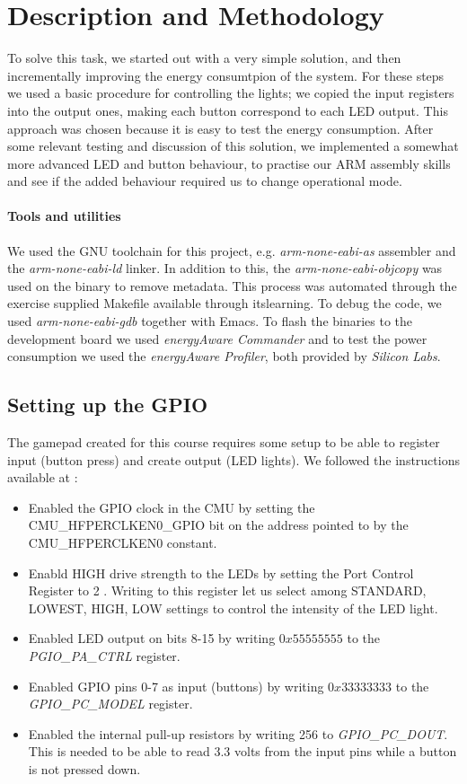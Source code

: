 \section{Description and Methodology}
\label{section:description_and_methodology}
To solve this task, we started out with a very simple solution, and then incrementally improving the energy consumtpion of the system. For these steps we used a basic procedure for controlling the lights; we copied the input registers into the output ones, making each button correspond to each LED output. This approach was chosen because it is easy to test the energy consumption. After some relevant testing and discussion of this solution, we implemented a somewhat more advanced LED and button behaviour, to practise our ARM assembly skills and see if the added behaviour required us to change operational mode. 

	\paragraph{Tools and utilities}
	We used the GNU toolchain for this project, e.g. \emph{arm-none-eabi-as} assembler and the \emph{arm-none-eabi-ld} linker. In addition to this, the \emph{arm-none-eabi-objcopy} was used on the binary to remove metadata. This process was automated through the exercise supplied Makefile available through itslearning. To debug the code, we used \emph{arm-none-eabi-gdb} together with Emacs. To flash the binaries to the development board we used \emph{energyAware Commander} and to test the power consumption we used the \emph{energyAware Profiler}, both provided by \emph{Silicon Labs}.
	\subsection{Setting up the GPIO}
	\label{subsection:gpio_setup}
	The gamepad created for this course requires some setup to be able to register input (button press) and create output (LED lights). We followed the instructions available at \cite[p. 24]{compendium}:
	
	\begin{itemize}
		\item Enabled the GPIO clock in the CMU by setting the CMU\_HFPERCLKEN0\_GPIO bit on the address pointed to by the CMU\_HFPERCLKEN0 constant.
		\item Enabld HIGH drive strength to the LEDs by setting the Port Control Register to 2 \cite[p. 766]{reference_manual}. Writing to this register let us select among STANDARD, LOWEST, HIGH, LOW settings to control the intensity of the LED light.
		\item Enabled LED output on bits 8-15 by writing $0x55555555$ to the \emph{PGIO\_PA\_CTRL} register.
		\item Enabled GPIO pins 0-7 as input (buttons) by writing $0x33333333$ to the \emph{GPIO\_PC\_MODEL} register.
		\item Enabled the internal pull-up resistors by writing 256 to \emph{GPIO\_PC\_DOUT}. This is needed to be able to read 3.3 volts from the input pins while a button is not pressed down. 
	\end{itemize}

